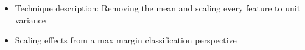 \begin{itemize}
	\item Technique description: Removing the mean and scaling every feature to unit variance
	\item Scaling effects from a max margin classification perspective
\end{itemize}